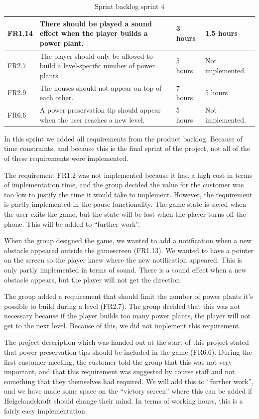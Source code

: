\begin{table} [H]
\begin{tabular}{| p{1cm} | p{7cm} | p{2cm} | p{2cm} |}
		FR1.14 & There should be played a sound effect when the player builds a power plant. 
		& 3 hours & 1.5 hours \\ \hline

		FR2.7 & The player should only be allowed to build a level-specific number of power plants. 
		& 5 hours & Not implemented.  \\ \hline

		FR2.9 & The houses should not appear on top of each other. 
		& 7 hours & 5 hours \\ \hline
		
		FR6.6 & A power preservation tip should appear when the user reaches a new level. 
		& 5 hours & Not implemented. \\ \hline

	\end{tabular}
	\caption{Sprint backlog sprint 4}
	\label{table:backlog4}
	\end{table}

	In this sprint we added all requirements from the product backlog. Because of time constraints,
	and because this is the final sprint of the project, not all of the of these requirements were
	implemented.

	The requirement FR1.2 was not implemented because it had a high cost in terms of implementation
	time, and the group decided the value for the customer was too low to justify the time it would
	take to implement. However, the requirement is partly implemented in the pause functionality.
	The game state is saved when the user exits the game, but the state will be lost when the player
	turns off the phone. This will be added to ``further work''.

	When the group designed the game, we wanted to add a notification when a new obstacle appeared
	outside the gamescreen (FR1.13). We wanted to have a pointer on the screen so the player knew
	where the new notification appeared. This is only partly implemented in terms of sound. There
	is a sound effect when a new obstacle appears, but the player will not get the direction.

	The group added a requirement that should limit the number of power plants it's possible to
	build during a level (FR2.7). The group decided that this was not necessary because if the
	player builds too many power plants, the player will not get to the next level. Because of this,
	we did not implement this requirement.

	The project description which was handed out at the start of this project stated that power
	preservation tips should be included in the game (FR6.6). During the first customer meeting,
	the customer told the group that this was not very important, and that this requirement was
	suggested by course staff and not something that they themselves had required. We will add
	this to ``further work'', and we have made some space on the ``victory screen'' where this can
	be added if Helgelandskraft should change their mind. In terms of working hours, this is a
	fairly easy implementation.

